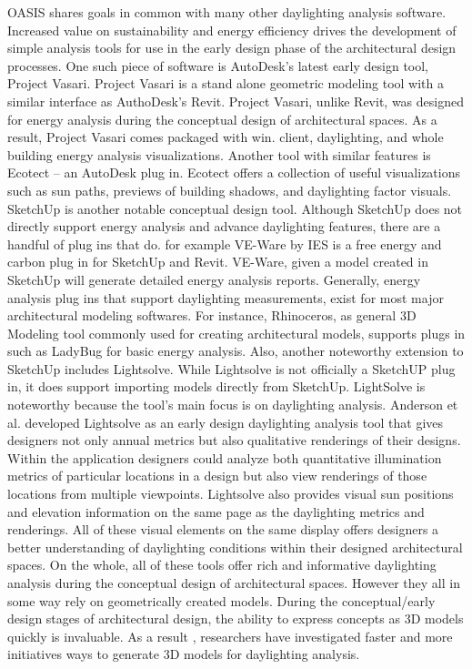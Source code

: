 	OASIS shares goals in common with many other daylighting analysis software.
	Increased value on sustainability and energy efficiency drives the development of simple analysis tools for use in the early design phase of the architectural design processes.
	One such piece of software is AutoDesk's latest early design tool, Project Vasari\cite{vasari,autodesk}.
	Project Vasari is a stand alone geometric modeling tool with a similar interface as AuthoDesk's Revit\cite{revit}.
	Project Vasari, unlike Revit, was designed for energy analysis during the conceptual design of architectural spaces. 
	As a result, Project Vasari comes packaged with win. client, daylighting, and whole building energy analysis visualizations.
	Another tool with similar features is Ecotect -- an AutoDesk plug in\cite{ecotect}.
	Ecotect offers a collection of useful visualizations such as sun paths, previews of building shadows, and daylighting factor visuals.
	SketchUp is another notable conceptual design tool\cite{sketchup}. 
	Although SketchUp does not directly support energy analysis and advance daylighting features, there are a handful of plug ins that do.
	for example VE-Ware by IES is a free energy and carbon plug in for SketchUp and Revit\cite{veware}. 
	VE-Ware, given a model created in SketchUp will generate detailed energy analysis reports. Generally, energy analysis plug ins that support daylighting  measurements, exist for most major architectural modeling softwares.
	For instance, Rhinoceros, as general 3D Modeling tool commonly used for creating architectural models, supports plugs in such as LadyBug  for basic energy analysis\cite{rhino,ladybug}. 
	Also, another noteworthy extension to SketchUp includes Lightsolve\cite{andersen2008intuitive}.
	While Lightsolve is not officially a SketchUP plug in, it does support importing models directly from SketchUp.
	LightSolve is noteworthy because the tool's main focus is on daylighting analysis.
	Anderson et al. developed Lightsolve as an early design daylighting analysis tool that gives designers not only annual metrics but also qualitative renderings of their designs. 
	Within the application designers could analyze both quantitative illumination metrics of particular locations in a design but also view renderings of those locations from multiple viewpoints.
	Lightsolve also provides visual sun positions and elevation information on the same page as the daylighting metrics and renderings. 
	All of these visual elements on the same display offers designers a better understanding of daylighting conditions within their designed architectural spaces\cite{andersen2011informing}. 
	On the whole, all of these tools offer rich and informative daylighting analysis during the conceptual  design of architectural spaces.
	However they all in some way rely on geometrically created models.
	During the conceptual/early design stages of architectural design, the ability to express concepts as 3D models quickly is invaluable.
	As a result , researchers have investigated faster and more initiatives ways to generate 3D models for daylighting analysis.
	